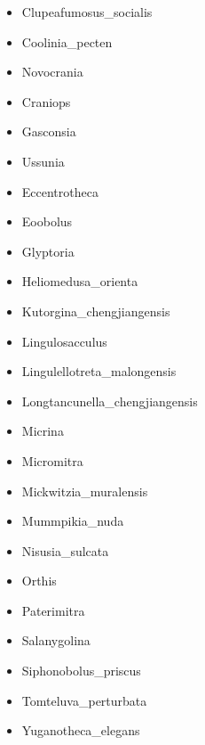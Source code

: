 \documentclass[openany]{book}
\theoremstyle{definition}
\theoremstyle{definition}
\theoremstyle{definition}
\theoremstyle{remark}
\begin{document}
\begin{itemize}
\item
  Clupeafumosus\_socialis\\
\item
  Coolinia\_pecten\\
\item
  Novocrania\\
\item
  Craniops\\
\item
  Gasconsia\\
\item
  Ussunia\\
\item
  Eccentrotheca\\
\item
  Eoobolus\\
\item
  Glyptoria\\
\item
  Heliomedusa\_orienta\\
\item
  Kutorgina\_chengjiangensis\\
\item
  Lingulosacculus\\
\item
  Lingulellotreta\_malongensis\\
\item
  Longtancunella\_chengjiangensis\\
\item
  Micrina\\
\item
  Micromitra\\
\item
  Mickwitzia\_muralensis\\
\item
  Mummpikia\_nuda\\
\item
  Nisusia\_sulcata\\
\item
  Orthis\\
\item
  Paterimitra\\
\item
  Salanygolina\\
\item
  Siphonobolus\_priscus\\
\item
  Tomteluva\_perturbata\\
\item
  Yuganotheca\_elegans
\end{itemize}
\end{document}
